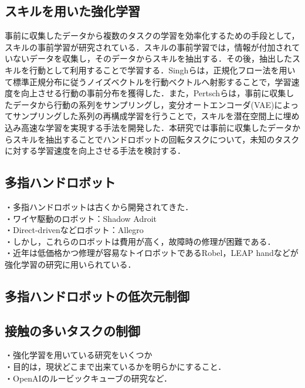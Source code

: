 \documentclass[dvipdfmx]{ampbt_nomag}
\begin{document}
\subsection{スキルを用いた強化学習}
事前に収集したデータから複数のタスクの学習を効率化するための手段として，スキルの事前学習が研究されている．スキルの事前学習では，情報が付加されていないデータを収集し，そのデータからスキルを抽出する．その後，抽出したスキルを行動として利用することで学習する．Singhらは，正規化フロー法\cite{dinh2016density}を用いて標準正規分布に従うノイズベクトルを行動ベクトルへ射影することで，学習速度を向上させる行動の事前分布を獲得した\cite{singh2020parrot}．また，Pertschらは，事前に収集したデータから行動の系列をサンプリングし，変分オートエンコーダ(VAE)によってサンプリングした系列の再構成学習を行うことで，スキルを潜在空間上に埋め込み高速な学習を実現する手法を開発した\cite{pertsch2021accelerating}．本研究では事前に収集したデータからスキルを抽出することでハンドロボットの回転タスクについて，未知のタスクに対する学習速度を向上させる手法を検討する．

\subsection{多指ハンドロボット}
・多指ハンドロボットは古くから開発されてきた．\\
  ・ワイヤ駆動のロボット：Shadow Adroit\cite{kumar2014real}\\
  ・Direct-drivenなどロボット：Allegro\\
・しかし，これらのロボットは費用が高く，故障時の修理が困難である．\\
・近年は低価格かつ修理が容易なトイロボットであるRobel\cite{ahn2020robel}，LEAP hand\cite{shaw2023leap}などが強化学習の研究に用いられている．\\

\subsection{多指ハンドロボットの低次元制御}

\subsection{接触の多いタスクの制御}
・強化学習を用いている研究をいくつか\\
・目的は，現状どこまで出来ているかを明らかにすること．\\
・OpenAIのルービックキューブの研究など．\\
\end{document}
